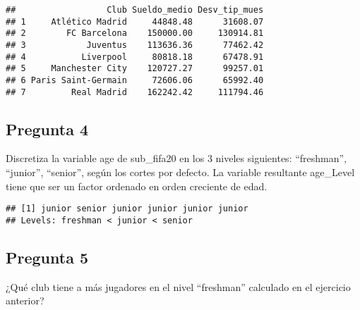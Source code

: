 \documentclass[
]{article}
\newenvironment{Shaded}{\begin{snugshade}}{\end{snugshade}}
\newcommand{\ControlFlowTok}[1]{\textcolor[rgb]{0.13,0.29,0.53}{\textbf{#1}}}
\newcommand{\DataTypeTok}[1]{\textcolor[rgb]{0.13,0.29,0.53}{#1}}
\newcommand{\DecValTok}[1]{\textcolor[rgb]{0.00,0.00,0.81}{#1}}
\newcommand{\KeywordTok}[1]{\textcolor[rgb]{0.13,0.29,0.53}{\textbf{#1}}}
\newcommand{\NormalTok}[1]{#1}
\newcommand{\OperatorTok}[1]{\textcolor[rgb]{0.81,0.36,0.00}{\textbf{#1}}}
\newcommand{\StringTok}[1]{\textcolor[rgb]{0.31,0.60,0.02}{#1}}
\begin{document}
\begin{verbatim}
##                  Club Sueldo_medio Desv_tip_mues
## 1     Atlético Madrid     44848.48      31608.07
## 2        FC Barcelona    150000.00     130914.81
## 3            Juventus    113636.36      77462.42
## 4           Liverpool     80818.18      67478.91
## 5     Manchester City    120727.27      99257.01
## 6 Paris Saint-Germain     72606.06      65992.40
## 7         Real Madrid    162242.42     111794.46
\end{verbatim}

\hypertarget{pregunta-4}{%
\subsection{Pregunta 4}\label{pregunta-4}}

Discretiza la variable age de sub\_fifa20 en los 3 niveles siguientes:
``freshman'', ``junior'', ``senior'', según los cortes por defecto. La
variable resultante age\_Level tiene que ser un factor ordenado en orden
creciente de edad.

\begin{Shaded}
\end{Shaded}

\begin{verbatim}
## [1] junior senior junior junior junior junior
## Levels: freshman < junior < senior
\end{verbatim}

\hypertarget{pregunta-5}{%
\subsection{Pregunta 5}\label{pregunta-5}}

¿Qué club tiene a más jugadores en el nivel ``freshman'' calculado en el
ejercicio anterior?

\begin{Shaded}
\end{Shaded}
\end{document}
